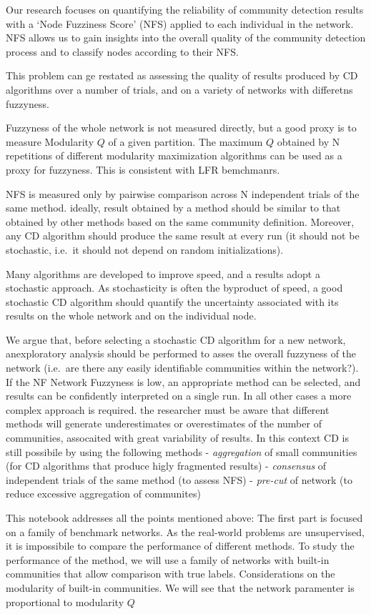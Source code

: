 \documentclass[
]{article}
\begin{document}
Our research focuses on quantifying the reliability of community
detection results with a `Node Fuzziness Score' (NFS) applied to each
individual in the network. NFS allows us to gain insights into the
overall quality of the community detection process and to classify nodes
according to their NFS.

This problem can ge restated as assessing the quality of results
produced by CD algorithms over a number of trials, and on a variety of
networks with differetns fuzzyness.

Fuzzyness of the whole network is not measured directly, but a good
proxy is to measure Modularity \(Q\) of a given partition. The maximum
\(Q\) obtained by N repetitions of different modularity maximization
algorithms can be used as a proxy for fuzzyness. This is consistent with
LFR bemchmanrs.

NFS is measured only by pairwise comparison across N independent trials
of the same method. ideally, result obtained by a method should be
similar to that obtained by other methods based on the same community
definition. Moreover, any CD algorithm should produce the same result at
every run (it should not be stochastic, i.e.~it should not depend on
random initializations).

Many algorithms are developed to improve speed, and a results adopt a
stochastic approach. As stochasticity is often the byproduct of speed, a
good stochastic CD algorithm should quantify the uncertainty associated
with its results on the whole network and on the individual node.

We argue that, before selecting a stochastic CD algorithm for a new
network, anexploratory analysis should be performed to asses the overall
fuzzyness of the network (i.e.~are there any easily identifiable
communities within the network?). If the NF Network Fuzzyness is low, an
appropriate method can be selected, and results can be confidently
interpreted on a single run. In all other cases a more complex approach
is required. the researcher must be aware that different methods will
generate underestimates or overestimates of the number of communities,
assocaited with great variability of results. In this context CD is
still possibile by using the following methods - \emph{aggregation} of
small communities (for CD algorithms that produce higly fragmented
results) - \emph{consensus} of independent trials of the same method (to
assess NFS) - \emph{pre-cut} of network (to reduce excessive aggregation
of communites)

This notebook addresses all the points mentioned above: The first part
is focused on a family of benchmark networks. As the real-world problems
are unsupervised, it is impossibile to compare the performance of
different methods. To study the performance of the method, we will use a
family of networks with built-in communities that allow comparison with
true labels. Considerations on the modularity of built-in communities.
We will see that the network paramenter \mu is proportional to
modularity \(Q\)
\end{document}
